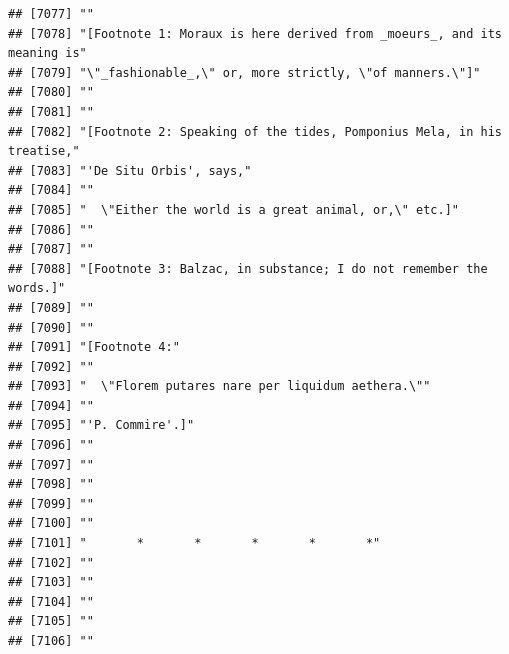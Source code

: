 \documentclass{article}\usepackage[]{graphicx}\usepackage[]{color}
\makeatletter
\newenvironment{kframe}{%
 \def\at@end@of@kframe{}%
 \ifinner\ifhmode%
  \def\at@end@of@kframe{\end{minipage}}%
  \begin{minipage}{\columnwidth}%
 \fi\fi%
 \def\FrameCommand##1{\hskip\@totalleftmargin \hskip-\fboxsep
 \colorbox{shadecolor}{##1}\hskip-\fboxsep
     \hskip-\linewidth \hskip-\@totalleftmargin \hskip\columnwidth}%
 \MakeFramed {\advance\hsize-\width
   \@totalleftmargin\z@ \linewidth\hsize
   \@setminipage}}%
 {\par\unskip\endMakeFramed%
 \at@end@of@kframe}
\newenvironment{knitrout}{}{} %
\makeatother
\begin{document}
\begin{knitrout}
\begin{kframe}
\begin{verbatim}
## [7077] ""                                                                            
## [7078] "[Footnote 1: Moraux is here derived from _moeurs_, and its meaning is"       
## [7079] "\"_fashionable_,\" or, more strictly, \"of manners.\"]"                      
## [7080] ""                                                                            
## [7081] ""                                                                            
## [7082] "[Footnote 2: Speaking of the tides, Pomponius Mela, in his treatise,"        
## [7083] "'De Situ Orbis', says,"                                                      
## [7084] ""                                                                            
## [7085] "  \"Either the world is a great animal, or,\" etc.]"                         
## [7086] ""                                                                            
## [7087] ""                                                                            
## [7088] "[Footnote 3: Balzac, in substance; I do not remember the words.]"            
## [7089] ""                                                                            
## [7090] ""                                                                            
## [7091] "[Footnote 4:"                                                                
## [7092] ""                                                                            
## [7093] "  \"Florem putares nare per liquidum aethera.\""                             
## [7094] ""                                                                            
## [7095] "'P. Commire'.]"                                                              
## [7096] ""                                                                            
## [7097] ""                                                                            
## [7098] ""                                                                            
## [7099] ""                                                                            
## [7100] ""                                                                            
## [7101] "       *       *       *       *       *"                                    
## [7102] ""                                                                            
## [7103] ""                                                                            
## [7104] ""                                                                            
## [7105] ""                                                                            
## [7106] ""                                                                            

\end{verbatim}
\end{kframe}
\end{knitrout}
\end{document}
